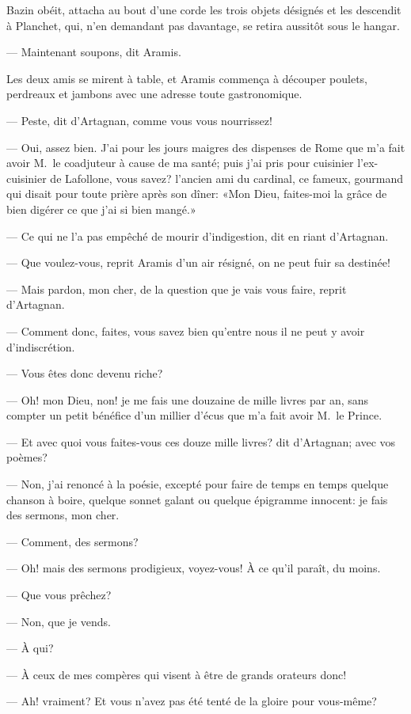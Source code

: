 Bazin obéit, attacha au bout d'une corde les trois objets désignés et les descendit à Planchet, qui, n'en demandant pas davantage, se retira aussitôt sous le hangar.

— Maintenant soupons, dit Aramis.

Les deux amis se mirent à table, et Aramis commença à découper poulets, perdreaux et jambons avec une adresse toute gastronomique.

— Peste, dit d'Artagnan, comme vous vous nourrissez!

— Oui, assez bien. J'ai pour les jours maigres des dispenses de Rome que m'a fait avoir M.~le coadjuteur à cause de ma santé; puis j'ai pris pour cuisinier l'ex-cuisinier de Lafollone, vous savez? l'ancien ami du cardinal, ce fameux, gourmand qui disait pour toute prière après son dîner: «Mon Dieu, faites-moi la grâce de bien digérer ce que j'ai si bien mangé.»

— Ce qui ne l'a pas empêché de mourir d'indigestion, dit en riant d'Artagnan.

— Que voulez-vous, reprit Aramis d'un air résigné, on ne peut fuir sa destinée!

— Mais pardon, mon cher, de la question que je vais vous faire, reprit d'Artagnan.

— Comment donc, faites, vous savez bien qu'entre nous il ne peut y avoir d'indiscrétion.

— Vous êtes donc devenu riche?

— Oh! mon Dieu, non! je me fais une douzaine de mille livres par an, sans compter un petit bénéfice d'un millier d'écus que m'a fait avoir M.~le Prince.

— Et avec quoi vous faites-vous ces douze mille livres? dit d'Artagnan; avec vos poèmes?

— Non, j'ai renoncé à la poésie, excepté pour faire de temps en temps quelque chanson à boire, quelque sonnet galant ou quelque épigramme innocent: je fais des sermons, mon cher.

— Comment, des sermons?

— Oh! mais des sermons prodigieux, voyez-vous! À ce qu'il paraît, du moins.

— Que vous prêchez?

— Non, que je vends.

— À qui?

— À ceux de mes compères qui visent à être de grands orateurs donc!

— Ah! vraiment? Et vous n'avez pas été tenté de la gloire pour vous-même?

